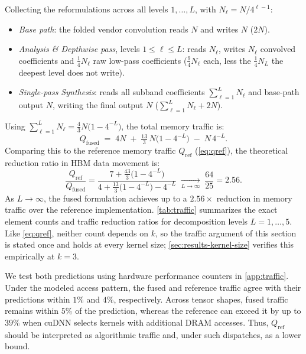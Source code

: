 \documentclass[10pt]{article} %
\newcommand{\Qio}{Q}                    %
\theoremstyle{plain}
\begin{document}
Collecting the reformulations across all levels $1,\dots,L$, with $N_\ell = N/4^{\ell-1}$:
\begin{itemize}\itemsep1pt
\item \emph{Base path}: the folded vendor convolution reads $N$ and writes $N$ ($2N$).
\item \emph{Analysis \& Depthwise pass}, levels $1\le\ell\le L$: reads $N_\ell$, writes $N_\ell$ convolved coefficients and $\tfrac14N_\ell$ raw low-pass coefficients ($\tfrac94N_\ell$ each, less the $\tfrac14N_L$ the deepest level does not write).
\item \emph{Single-pass Synthesis}: reads all subband coefficients $\sum_{\ell=1}^L N_\ell$ and base-path output $N$, writing the final output $N$ ($\sum_{\ell=1}^L N_\ell + 2N$).
\end{itemize}
Using $\sum_{\ell=1}^{L}N_\ell=\tfrac43N\bigl(1-4^{-L}\bigr)$, the total memory traffic is:
\begin{equation}
\Qio_{\mathrm{fused}} \;=\; 4N \;+\; \tfrac{13}{3}\,N\bigl(1-4^{-L}\bigr) \;-\; N\,4^{-L}.
\label{eq:qfused}
\end{equation}
Comparing this to the reference memory traffic $\Qio_{\mathrm{ref}}$ (\autoref{eq:qref}), the theoretical reduction ratio in HBM data movement is:
\begin{equation}
\frac{\Qio_{\mathrm{ref}}}{\Qio_{\mathrm{fused}}}
= \frac{7 + \tfrac{43}{3}\bigl(1-4^{-L}\bigr)}{4 + \tfrac{13}{3}\bigl(1-4^{-L}\bigr) - 4^{-L}}
\;\xrightarrow[L\to\infty]{}\; \frac{64}{25} = 2.56.
\label{eq:qratio}
\end{equation}
As $L \to \infty$, the fused formulation achieves up to a $2.56\times$ reduction in memory traffic over the reference implementation. \autoref{tab:traffic} summarizes the exact element counts and traffic reduction ratios for decomposition levels $L{=}1,\dots,5$. Like \autoref{eq:qref}, neither count depends on $k$, so the traffic argument of this section is stated once and holds at every kernel size; \autoref{sec:results-kernel-size} verifies this empirically at $k{=}3$.

We test both predictions using hardware performance counters in \autoref{app:traffic}. Under the modeled access pattern, the fused and reference traffic agree with their predictions within $1\%$ and $4\%$, respectively. Across tensor shapes, fused traffic remains within $5\%$ of the prediction, whereas the reference can exceed it by up to $39\%$ when cuDNN selects kernels with additional DRAM accesses. Thus, $\Qio_{\mathrm{ref}}$ should be interpreted as algorithmic traffic and, under such dispatches, as a lower bound.
\end{document}
